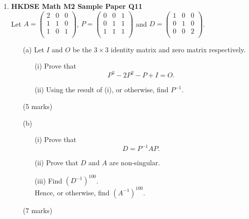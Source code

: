 \documentclass{report}
\begin{document}
\begin{enumerate}
	\newpage

	\item \textbf{HKDSE Math M2 Sample Paper Q11}\\
	Let $A = \begin{pmatrix}
		2 & 0 & 0\\
		1 & 1 & 0\\
		1 & 0 & 1\\
	\end{pmatrix}$, $P = \begin{pmatrix}
		0 & 0 & 1\\
		0 & 1 & 1\\
		1 & 1 & 1\\
	\end{pmatrix}$ and $D = \begin{pmatrix}
		1 & 0 & 0\\
		0 & 1 & 0\\
		0 & 0 & 2\\
	\end{pmatrix}$.
	\begin{enumerate}
		\item [(a)]Let $I$ and $O$ be the $3\times3$ identity matrix and zero matrix respectively. 
		\begin{enumerate}
			\item [(i)]Prove that $$P^3 -2P^2 - P + I = O.$$
			\item [(ii)]Using the result of (i), or otherwise, find $P^{-1}$.
		\end{enumerate}
		(5 marks)
		\item [(b)]
		\begin{enumerate}
			\item [(i)]Prove that $$D = P^{-1}AP.$$ 
			\item [(ii)]Prove that $D$ and $A$ are non-singular. 
			\item [(iii)]Find $(D^{-1})^{100}$. \\
			Hence, or otherwise, find $(A^{-1})^{100}$.
		\end{enumerate}
		(7 marks)
	\end{enumerate}


\end{enumerate}
\end{document}
